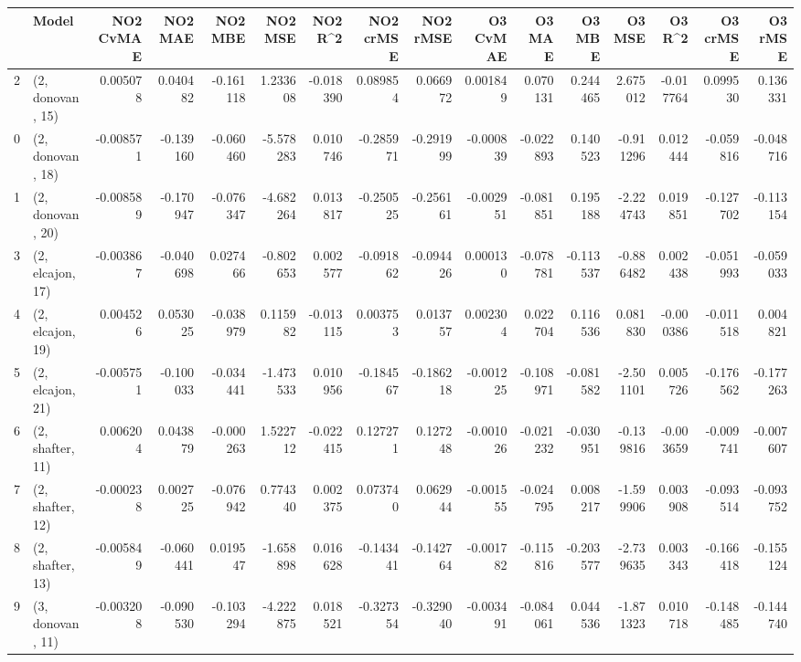\begin{tabular}{llrrrrrrrrrrrrrr}
\toprule
{} &             Model &  NO2 CvMAE &   NO2 MAE &   NO2 MBE &    NO2 MSE &   NO2 R\textasciicircum2 &  NO2 crMSE &  NO2 rMSE &  O3 CvMAE &    O3 MAE &    O3 MBE &     O3 MSE &    O3 R\textasciicircum2 &  O3 crMSE &   O3 rMSE \\
\midrule
2  &  (2, donovan, 15) &   0.005078 &  0.040482 & -0.161118 &   1.233608 & -0.018390 &   0.089854 &  0.066972 &  0.001849 &  0.070131 &  0.244465 &   2.675012 & -0.017764 &  0.099530 &  0.136331 \\
0  &  (2, donovan, 18) &  -0.008571 & -0.139160 & -0.060460 &  -5.578283 &  0.010746 &  -0.285971 & -0.291999 & -0.000839 & -0.022893 &  0.140523 &  -0.911296 &  0.012444 & -0.059816 & -0.048716 \\
1  &  (2, donovan, 20) &  -0.008589 & -0.170947 & -0.076347 &  -4.682264 &  0.013817 &  -0.250525 & -0.256161 & -0.002951 & -0.081851 &  0.195188 &  -2.224743 &  0.019851 & -0.127702 & -0.113154 \\
3  &  (2, elcajon, 17) &  -0.003867 & -0.040698 &  0.027466 &  -0.802653 &  0.002577 &  -0.091862 & -0.094426 &  0.000130 & -0.078781 & -0.113537 &  -0.886482 &  0.002438 & -0.051993 & -0.059033 \\
4  &  (2, elcajon, 19) &   0.004526 &  0.053025 & -0.038979 &   0.115982 & -0.013115 &   0.003753 &  0.013757 &  0.002304 &  0.022704 &  0.116536 &   0.081830 & -0.000386 & -0.011518 &  0.004821 \\
5  &  (2, elcajon, 21) &  -0.005751 & -0.100033 & -0.034441 &  -1.473533 &  0.010956 &  -0.184567 & -0.186218 & -0.001225 & -0.108971 & -0.081582 &  -2.501101 &  0.005726 & -0.176562 & -0.177263 \\
6  &  (2, shafter, 11) &   0.006204 &  0.043879 & -0.000263 &   1.522712 & -0.022415 &   0.127271 &  0.127248 & -0.001026 & -0.021232 & -0.030951 &  -0.139816 & -0.003659 & -0.009741 & -0.007607 \\
7  &  (2, shafter, 12) &  -0.000238 &  0.002725 & -0.076942 &   0.774340 &  0.002375 &   0.073740 &  0.062944 & -0.001555 & -0.024795 &  0.008217 &  -1.599906 &  0.003908 & -0.093514 & -0.093752 \\
8  &  (2, shafter, 13) &  -0.005849 & -0.060441 &  0.019547 &  -1.658898 &  0.016628 &  -0.143441 & -0.142764 & -0.001782 & -0.115816 & -0.203577 &  -2.739635 &  0.003343 & -0.166418 & -0.155124 \\
9  &  (3, donovan, 11) &  -0.003208 & -0.090530 & -0.103294 &  -4.222875 &  0.018521 &  -0.327354 & -0.329040 & -0.003491 & -0.084061 &  0.044536 &  -1.871323 &  0.010718 & -0.148485 & -0.144740 \\

\end{tabular}
